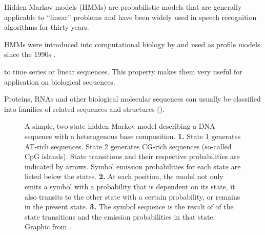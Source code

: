\label{sec:hmms}
Hidden Markov models (HMMs) are probabilistic models that are generally
applicable to ``linear'' problems and have been widely used in speech
recognition algorithms for thirty years. 

HMMs were introduced into computational biology by \citet{churchill1989} and
used as profile models since the 1990s \citep{krogh1994}.

to time series or linear sequences.  This property makes them very useful for
application on biological sequences.

Proteins, RNAs and other biological molecular sequences can usually be
classified into families of related sequences and structures
(\cite{henikoff1997}).

\begin{figure}[h]
	\centering
	\def\svgwidth{\textwidth}
	
	\caption[A simple hidden Markov model]{A simple, two-state hidden Markov model
		describing a DNA sequence with a heterogenous base composition. 
		\textbf{1.} State 1 generates AT-rich sequences. State 2 generates CG-rich
			sequences (so-called CpG islands). State transitions and their respective
			probabilities are indicated by arrows. Symbol emission probabilities for
			each state are listed below the states.
		\textbf{2.} At each position, the model not only emits a symbol with a
			probability that is dependent on its state, it also transits to the
			other state with a certain probability, or remains in the present state.
		\textbf{3.} The symbol sequence is the result of of the state transitions and
			the emission probabilities in that state.
		Graphic from \citet{eddy1996}.
	}
	\label{fig:hmm}
\end{figure}
